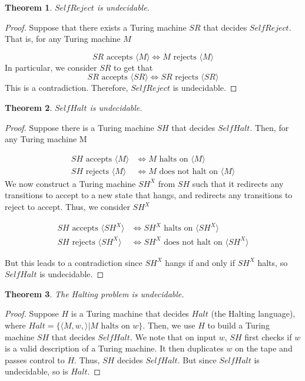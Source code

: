 \documentclass[11pt]{article}
\theoremstyle{plain} %
\newtheorem*{theorem}{Theorem}
\theoremstyle{definition}
\theoremstyle{example}
\theoremstyle{remark}
\begin{document}
\begin{theorem}
  $SelfReject$ is undecidable.
\end{theorem}


\begin{proof}
Suppose that there exists a Turing machine $SR$ that decides $SelfReject$. That is, for any Turing machine $M$ 

$$SR  \text{ accepts } \langle M \rangle \iff M \text{ rejects } \langle M \rangle$$ In particular, we consider $SR$ to get that $$SR \text{ accepts } \langle SR \rangle \iff SR \text{ rejects }\langle SR \rangle$$
This is a contradiction. Therefore, $SelfReject$ is undecidable. 
\end{proof}
\begin{theorem}
 $SelfHalt$ is undecidable.
\end{theorem}

\begin{proof}
Suppose there is a Turing machine $SH$ that decides $SelfHalt$. Then, for any Turing machine M

\begin{align*}SH \text{ accepts } \langle M\rangle &\iff M \text{ halts on } \langle M \rangle\\
SH \text { rejects } \langle M \rangle &\iff M \text{ does not halt on } \langle M \rangle
\end{align*}
We now construct a Turing machine $SH^X$ from $SH$ such that it redirects any transitions to accept to a new state that hangs, and redirects any transitions to reject to accept. Thus, we consider $SH^X$

\begin{align*}
SH \text{ accepts } \langle SH^X\rangle &\iff SH^X \text{ halts on } \langle SH^X\rangle\\
SH \text { rejects } \langle SH^X \rangle &\iff SH^X \text{ does not halt on } \langle SH^X \rangle
\end{align*}

But this leads to a contradiction since $SH^X$ hangs if and only if $SH^X$ halts, so $SelfHalt$ is undecidable.
\end{proof}

\begin{theorem}
The Halting problem is undecidable. 
\end{theorem}

\begin{proof}Suppose $H$ is a Turing machine that decides $Halt$ (the Halting language), where $Halt = \{ \langle M, w, \rangle | M \text{ halts on } w \}$. Then, we use $H$ to build a Turing machine $SH$ that decides $SelfHalt$. We note that on input $w$, $SH$ first checks if $w$ is a valid description of a Turing machine. It then duplicates $w$ on the tape and passes control to $H$. Thus, $SH$ decides $SelfHalt$. But since $SelfHalt$ is undecidable, so is $Halt$. 
\end{proof} 
\end{document}
